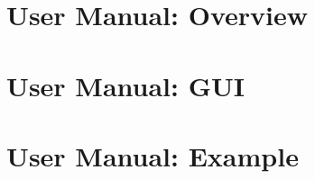 \chapter{\dabc\ User Manual: Overview}
 \cleardoublepage
\chapter{\dabc\ User Manual: GUI}
 \cleardoublepage
\chapter{\dabc\ User Manual: Example \mbs}
 \cleardoublepage

